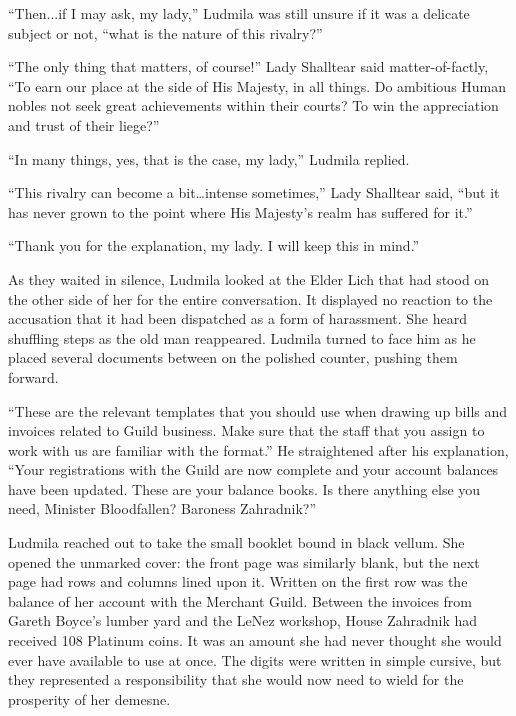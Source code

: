  

“Then...if I may ask, my lady,” Ludmila was still unsure if it was a delicate subject or not, “what is the nature of this rivalry?”

 

“The only thing that matters, of course!” Lady Shalltear said matter-of-factly, “To earn our place at the side of His Majesty, in all things. Do ambitious Human nobles not seek great achievements within their courts? To win the appreciation and trust of their liege?”

 

“In many things, yes, that is the case, my lady,” Ludmila replied.

 

“This rivalry can become a bit…intense sometimes,” Lady Shalltear said, “but it has never grown to the point where His Majesty’s realm has suffered for it.”

 

“Thank you for the explanation, my lady. I will keep this in mind.”

 

As they waited in silence, Ludmila looked at the Elder Lich that had stood on the other side of her for the entire conversation. It displayed no reaction to the accusation that it had been dispatched as a form of harassment. She heard shuffling steps as the old man reappeared. Ludmila turned to face him as he placed several documents between on the polished counter, pushing them forward.

 

“These are the relevant templates that you should use when drawing up bills and invoices related to Guild business. Make sure that the staff that you assign to work with us are familiar with the format.” He straightened after his explanation, “Your registrations with the Guild are now complete and your account balances have been updated. These are your balance books. Is there anything else you need, Minister Bloodfallen? Baroness Zahradnik?”

 

Ludmila reached out to take the small booklet bound in black vellum. She opened the unmarked cover: the front page was similarly blank, but the next page had rows and columns lined upon it. Written on the first row was the balance of her account with the Merchant Guild. Between the invoices from Gareth Boyce’s lumber yard and the LeNez workshop, House Zahradnik had received 108 Platinum coins. It was an amount she had never thought she would ever have available to use at once. The digits were written in simple cursive, but they represented a responsibility that she would now need to wield for the prosperity of her demesne.

